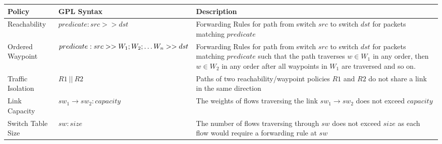 \begin{table*}[thb!]
\begin{small}
	\begin{center}
		\begin{tabular}{||m{6em} | m{12em} | m{28em} ||} 
			\hline
			Policy &  GPL Syntax & Description \\ 
			\hline\hline
			Reachability & 	$predicate : src >> dst$ & Forwarding Rules for path from switch $src$ to switch $dst$ for packets matching $predicate$ \\
			\hline
			Ordered Waypoint & $predicate :\newline src >> W_1;W_2; \ldots W_n >> dst$ & Forwarding Rules for path from switch $src$ to switch $dst$ for packets matching $predicate$ such that the path traverses $w \in W_1$ in any order, then $w \in W_2$ in any order after all waypoints in $W_1$ are traversed and so on.\\  
			\hline
			Traffic \newline Isolation & $R1 \ || \ R2$ & Paths of two reachability/waypoint policies $R1$ and $R2$ do not share a link in the same direction \\
			\hline
			Link \newline Capacity & $sw_1 \rightarrow sw_2 : capacity$  & The weights of flows traversing the link $sw_1 \rightarrow sw_2$ does not exceed $capacity$\\
			\hline
			Switch \newline Table Size & $sw : size$ & The number of flows traversing through $sw$ does not exceed $size$ as each flow would require a forwarding rule at $sw$ \\
			\hline\hline
		\end{tabular}
	\end{center}
	 \label{tab:policysupport} 
\end{small}
\end{table*}


